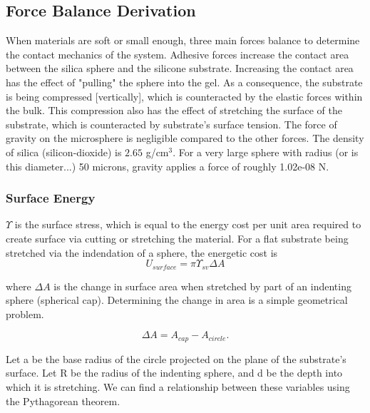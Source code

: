 \subsection{Force Balance Derivation}
When materials are soft or small enough, three main forces balance to determine the contact mechanics of the system. Adhesive forces increase the contact area between the silica sphere and the silicone substrate. Increasing the contact area has the effect of "pulling" the sphere into the gel. As a consequence, the substrate is being compressed [vertically], which is counteracted by the elastic forces within the bulk. This compression also has the effect of stretching the surface of the substrate, which is counteracted by substrate's surface tension. The force of gravity on the microsphere is negligible compared to the other forces. The density of silica (silicon-dioxide) is $2.65$ g/cm$^3$. For a very large sphere with radius (or is this diameter...) 50 microns, gravity applies a force of roughly 1.02e-08 N.

\subsubsection{Surface Energy}
$\Upsilon$ is the surface stress, which is equal to the energy cost per unit area required to create surface via cutting or stretching the material. For a flat substrate being stretched via the indendation of a sphere, the energetic cost is
\begin{equation}
\label{generic_surface_energy}
U_{surface} = \pi \Upsilon_{sv}\Delta A
\end{equation}

where $\Delta A$ is the change in surface area when stretched by part of an indenting sphere (spherical cap). Determining the change in area is a simple geometrical problem.

\begin{equation}
\Delta A = A_{cap} - A_{circle}. 
\end{equation}

Let a be the base radius of the circle projected on the plane of the substrate's surface. Let R be the radius of the indenting sphere, and d be the depth into which it is stretching. We can find a relationship between these variables using the Pythagorean theorem.

